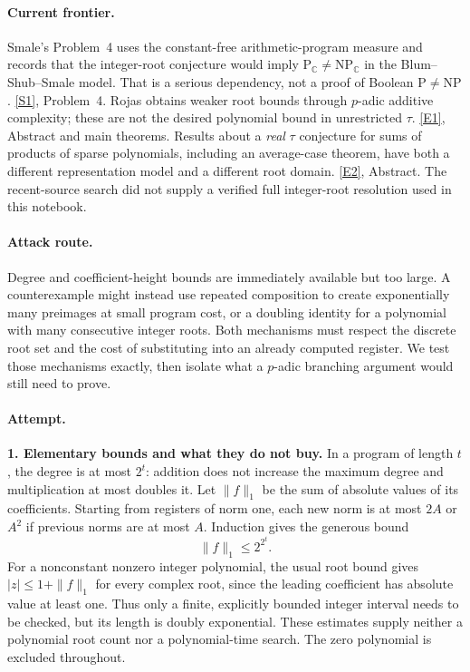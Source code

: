 \documentclass[11pt,a4paper]{article}
\newcommand{\C}{\mathbb{C}}
\newcommand{\sref}[2]{\hyperlink{source:#1:#2}{[S#2]}}
\newcommand{\eref}[2]{\hyperlink{extra:#1:#2}{[E#2]}}
\numberwithin{equation}{section}
\begin{document}
\paragraph{Current frontier.}
Smale's Problem~4 uses the constant-free arithmetic-program measure and
records that the integer-root conjecture would imply
$\mathrm P_{\C}\ne\mathrm{NP}_{\C}$ in the Blum--Shub--Smale model.
That is a serious dependency, not a proof of Boolean $\mathrm P\ne
\mathrm{NP}$. \sref{statement}{1}, Problem~4.
Rojas obtains weaker root bounds through $p$-adic additive complexity;
these are not the desired polynomial bound in unrestricted $\tau$.
\eref{statement}{1}, Abstract and main theorems. Results about a \emph{real}
$\tau$ conjecture for sums of products of sparse polynomials, including
an average-case theorem, have both a different representation model and
a different root domain. \eref{statement}{2}, Abstract.
The recent-source search did not supply a verified full integer-root
resolution used in this notebook.

\paragraph{Attack route.}
Degree and coefficient-height bounds are immediately available but too
large. A counterexample might instead use repeated composition to create
exponentially many preimages at small program cost, or a doubling identity
for a polynomial with many consecutive integer roots. Both mechanisms
must respect the discrete root set and the cost of substituting into an
already computed register. We test those mechanisms exactly, then isolate
what a $p$-adic branching argument would still need to prove.

\paragraph{Attempt.}
\textbf{1. Elementary bounds and what they do not buy.}
In a program of length $t$, the degree is at most $2^t$: addition does
not increase the maximum degree and multiplication at most doubles it.
Let $\|f\|_1$ be the sum of absolute values of its coefficients. Starting
from registers of norm one, each new norm is at most $2A$ or $A^2$ if
previous norms are at most $A$. Induction gives the generous bound
\[
 \|f\|_1\le 2^{2^t}.
\]
For a nonconstant nonzero integer polynomial, the usual root bound gives
$|z|\le1+\|f\|_1$ for every complex root, since the leading coefficient
has absolute value at least one. Thus only a finite, explicitly bounded
integer interval needs to be checked, but its length is doubly
exponential. These estimates supply neither a polynomial root count nor
a polynomial-time search. The zero polynomial is excluded throughout.
\end{document}
